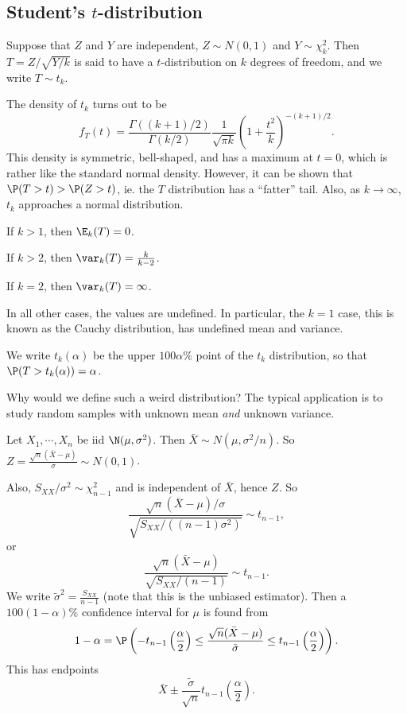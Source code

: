\documentclass[a4paper]{article}
\begin{document}
\subsection{Student's \texorpdfstring{$t$}{t}-distribution}
\begin{defi}[$t$-distribution]
  Suppose that $Z$ and $Y$ are independent, $Z\sim N(0, 1)$ and $Y\sim \chi_k^2$. Then $T = Z/\sqrt{Y/k}$ is said to have a $t$-distribution on $k$ degrees of freedom, and we write $T\sim t_k$.
\end{defi}

The density of $t_k$ turns out to be
\[
  f_T(t) = \frac{\Gamma((k + 1)/2)}{\Gamma(k/2)} \frac{1}{\sqrt{\pi k}}\left(1 + \frac{t^2}{k}\right)^{-(k+1)/2}.
\]
This density is symmetric, bell-shaped, and has a maximum at $t = 0$, which is rather like the standard normal density. However, it can be shown that $\P(T > t) > \P(Z > t)$, ie. the $T$ distribution has a ``fatter'' tail. Also, as $k \to \infty$, $t_k$ approaches a normal distribution.

\begin{prop}
  If $k > 1$, then $\E_k(T) = 0$.

  If $k > 2$, then $\var_k(T) = \frac{k}{k - 2}$.

  If $k = 2$, then $\var_k(T) = \infty$.

  In all other cases, the values are undefined. In particular, the $k = 1$ case, this is known as the Cauchy distribution, has undefined mean and variance.
\end{prop}

\begin{notation}
  We write $t_k(\alpha)$ be the upper $100\alpha\%$ point of the $t_k$ distribution, so that $\P(T > t_k(\alpha)) = \alpha$.
\end{notation}

Why would we define such a weird distribution? The typical application is to study random samples with unknown mean \emph{and} unknown variance.

Let $X_1, \cdots, X_n$ be iid $\N(\mu, \sigma^2)$. Then $\bar X \sim N(\mu, \sigma^2/n)$. So $Z = \frac{\sqrt{n}(\bar X - \mu)}{\sigma} \sim N(0, 1)$.

Also, $S_{XX}/\sigma^2 \sim \chi^2_{n - 1}$ and is independent of $\bar X$, hence $Z$. So
\[
  \frac{\sqrt{n}(\bar X - \mu)/\sigma}{\sqrt{S_{XX}/((n - 1)\sigma^2)}} \sim t_{n - 1},
\]
or
\[
  \frac{\sqrt{n}(\bar X - \mu)}{\sqrt{S_{XX}/(n - 1)}} \sim t_{n - 1}.
\]
We write $\tilde{\sigma}^2 = \frac{S_{XX}}{n - 1}$ (note that this is the unbiased estimator). Then a $100(1 - \alpha)\%$ confidence interval for $\mu$ is found from
\[
  1 - \alpha = \P\left(-t_{n - 1}\left(\frac{\alpha}{2}\right) \leq \frac{\sqrt{n}(\bar X - \mu)}{\tilde{\sigma}} \leq t_{n - 1}\left(\frac{\alpha}{2}\right)\right).
\]
This has endpoints
\[
  \bar X \pm \frac{\tilde{\sigma}}{\sqrt{n}}t_{n - 1}\left(\frac{\alpha}{2}\right).
\]
\end{document}
